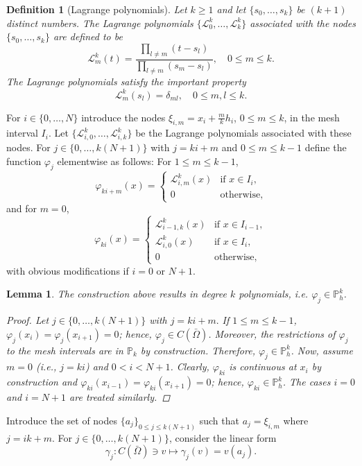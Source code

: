 \documentclass{article}
\newtheorem{definition}{Definition}
\newtheorem{lemma}{Lemma}
\begin{document}
\begin{definition}[Lagrange polynomials]\label{def:lagrangepolynomials}
    Let $k \ge 1$ and let $\{s_0, \dots, s_k\}$ be $(k+1)$ distinct numbers. The Lagrange polynomials $\{\mathcal{L}_0^k, \dots, \mathcal{L}_k^k\}$ associated with the nodes $\{s_0, \dots, s_k\}$ are defined to be
    $$ \mathcal{L}_m^k(t) = \frac{\prod_{l \ne m}(t - s_l)}{\prod_{l \ne m}(s_m - s_l)}, \quad 0 \le m \le k. $$
    The Lagrange polynomials satisfy the important property
    $$ \mathcal{L}_m^k(s_l) = \delta_{ml}, \quad 0 \le m,l \le k. $$
\end{definition}
For $i \in \{0, \dots, N\}$ introduce the nodes $\xi_{i,m} = x_i + \frac{m}{k}h_i$, $0 \le m \le k$, in the mesh interval $I_i$. Let $\{\mathcal{L}_{i,0}^k, \dots, \mathcal{L}_{i,k}^k\}$ be the Lagrange polynomials associated with these nodes. For $j \in \{0, \dots, k(N+1)\}$ with $j = ki + m$ and $0 \le m \le k-1$ define the function $\varphi_j$ elementwise as follows: For $1 \le m \le k-1$,
$$ \varphi_{ki+m}(x) = \begin{cases} \mathcal{L}_{i,m}^k(x) & \text{if } x \in I_i, \\ 0 & \text{otherwise}, \end{cases} $$
and for $m=0$,
$$ \varphi_{ki}(x) = \begin{cases} \mathcal{L}_{i-1,k}^k(x) & \text{if } x \in I_{i-1}, \\ \mathcal{L}_{i,0}^k(x) & \text{if } x \in I_i, \\ 0 & \text{otherwise}, \end{cases} $$
with obvious modifications if $i = 0$ or $N+1$.
\begin{lemma}\label{basis_functions_Pk}
    The construction above results in degree $k$ polynomials, i.e. $\varphi_j \in \mathbb{P}_h^k$.
\begin{proof}
    Let $j \in \{0, \dots, k(N+1)\}$ with $j = ki + m.$ If $1 \le m \le k-1$, $\varphi_j(x_i) = \varphi_j(x_{i+1}) = 0$; hence, $\varphi_j \in C(\bar{\Omega})$. Moreover, the restrictions of $\varphi_j$ to the mesh intervals are in $\mathbb{P}_k$ by construction. Therefore, $\varphi_j \in \mathbb{P}_h^k$. Now, assume $m = 0$ (i.e., $j=ki$) and $0 < i < N+1$. Clearly, $\varphi_{ki}$ is continuous at $x_i$ by construction and $\varphi_{ki}(x_{i-1}) = \varphi_{ki}(x_{i+1}) = 0$; hence, $\varphi_{ki} \in \mathbb{P}_h^k$. The cases $i = 0$ and $i = N+1$ are treated similarly.
\end{proof}
\end{lemma}
Introduce the set of nodes $\{a_j\}_{0 \le j \le k(N+1)}$ such that $a_j = \xi_{i,m}$ where $j = ik + m$. For $j \in \{0, \dots, k(N+1)\}$, consider the linear form
$$ \gamma_j: C(\bar{\Omega}) \ni v \mapsto \gamma_j(v) = v(a_j). $$
\end{document}
